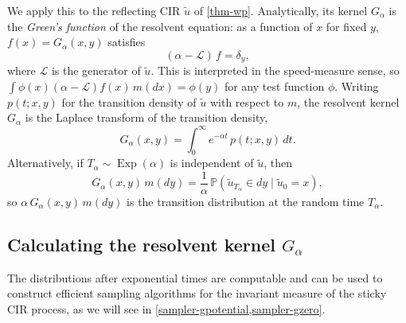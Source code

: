 \documentclass[aap,preprint]{imsart}
\DeclarePairedDelimiter{\bpair}{[}{]} %
\newcommand\bp[2][0pt]{\bpair*{#2}} %
\numberwithin{equation}{section}
\theoremstyle{plain}
\theoremstyle{definition}
\begin{document}
We apply this to the reflecting CIR $\tilde u$ of \cref{thm-wp}.  Analytically, its kernel $G_\alpha$ is  the \emph{Green's function} of the resolvent equation: as a function of $x$ for fixed $y$, $f(x) = G_\alpha(x,y)$ satisfies
\begin{equation}\label{eq:resolvent-ode}
  (\alpha - \mathcal L)\,f = \delta_y,
\end{equation}
where $\mathcal L$ is the generator of $\tilde u$. This is interpreted in the speed-measure sense, so $\int \phi(x)(\alpha-\mathcal L)f(x)\,m(dx)=\phi(y)$ for any test function $\phi$.
Writing $p(t;x,y)$ for the transition density of $\tilde u$ with respect to $m$, the resolvent kernel $G_\alpha$ is the Laplace transform of the transition density,
\begin{equation}\label{eq:green-laplace}
  G_\alpha(x,y) = \int_0^\infty e^{-\alpha t}\,p(t;x,y)\,dt.
\end{equation}
Alternatively, if $T_\alpha\sim\operatorname{Exp}(\alpha)$ is independent of $\tilde u$, then
\begin{equation}\label{eq:green-resolvent}
  G_\alpha(x,y)\,m(dy) = \frac{1}{\alpha}\,\mathbb{P}(\tilde u_{T_\alpha}\in dy\mid \tilde u_0=x),
\end{equation}
so $\alpha\,G_\alpha(x,y)\,m(dy)$ is the transition distribution at the
random time $T_\alpha$.

\subsection{Calculating the resolvent kernel \texorpdfstring{$G_\alpha$}{G\_alpha}}\label{green-function}

 The distributions after exponential  times are computable and can be used to construct efficient sampling algorithms for the invariant measure of the sticky CIR process, as we will see in
 \cref{sampler-gpotential,sampler-gzero}.
\end{document}
